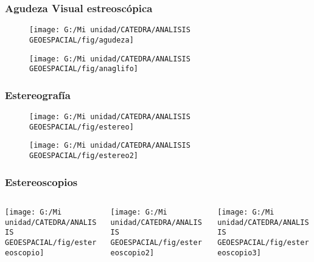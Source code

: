 \documentclass[14pt]{beamer}
\begin{document}
\begin{frame}
 \frametitle{Agudeza Visual estreoscópica}
 \begin{figure}
    \centering
    \texttt{[image: G:/Mi unidad/CATEDRA/ANALISIS GEOESPACIAL/fig/agudeza]}
  \end{figure}
\end{frame}
\begin{frame}
 \begin{figure}
    \centering
    \texttt{[image: G:/Mi unidad/CATEDRA/ANALISIS GEOESPACIAL/fig/anaglifo]}
  \end{figure}
\end{frame}
\begin{frame}
\frametitle{Estereografía} 
 \begin{figure}
    \centering
    \texttt{[image: G:/Mi unidad/CATEDRA/ANALISIS GEOESPACIAL/fig/estereo]}
  \end{figure}
\end{frame}
\begin{frame}
 \begin{figure}
    \centering
    \texttt{[image: G:/Mi unidad/CATEDRA/ANALISIS GEOESPACIAL/fig/estereo2]}
  \end{figure}
\end{frame}
\begin{frame}
\frametitle{Estereoscopios}
  \begin{columns}
		\begin{column}{.3\linewidth}
		 \texttt{[image: G:/Mi unidad/CATEDRA/ANALISIS GEOESPACIAL/fig/estereoscopio]}
		\end{column}
		\begin{column}{.3\linewidth}
\texttt{[image: G:/Mi unidad/CATEDRA/ANALISIS GEOESPACIAL/fig/estereoscopio2]}
		\end{column}
		\begin{column}{.3\linewidth}
\texttt{[image: G:/Mi unidad/CATEDRA/ANALISIS GEOESPACIAL/fig/estereoscopio3]}
		\end{column}
	\end{columns}
\end{frame}
\end{document}
